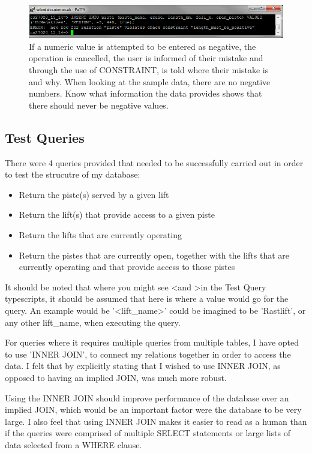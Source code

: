\documentclass[11pt]{scrartcl} %
\begin{document}
\begin{figure}[H]
  \centering
    \includegraphics[width=1\textwidth]{IMG/err_no_negatives.png}
 \caption{If a numeric value is attempted to be entered as negative, the operation is cancelled, the user is informed of their mistake and through the use of CONSTRAINT, is told where their mistake is and why. When looking at the sample data, there are no negative numbers. Know what information the data provides shows that there should never be negative values.}
\end{figure}
\newpage

\subsection{Test Queries}
There were 4 queries provided that needed to be successfully carried out in order to test the strucutre of my database:
\begin{itemize}
\item Return the piste(s) served by a given lift
\item Return the lift(s) that provide access to a given piste
\item Return the lifts that are currently operating
\item Return the pistes that are currently open, together with the lifts that are currently operating and that provide access to those pistes
\end{itemize}
It should be noted that where you might see \textless \space and \textgreater in the Test Query typescripts, it should be assumed that here is where a value would go for the query. An example would be '\textless lift\_name\textgreater ' could be imagined to be 'Rastlift', or any other lift\_name, when executing the query.

For queries where it requires multiple queries from multiple tables, I have opted to use 'INNER JOIN', to connect my relations together in order to access the data. I felt that by explicitly stating that I wished to use INNER JOIN, as opposed to having an implied JOIN, was much more robust.

Using the INNER JOIN should improve performance of the database over an implied JOIN, which would be an important factor were the database to be very large. I also feel that using INNER JOIN makes it easier to read as a human than if the queries were comprised of multiple SELECT statements or large lists of data selected from a WHERE clause.
\end{document}
